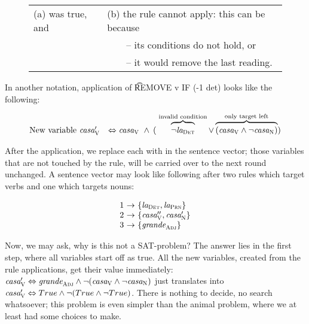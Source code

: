 \begin{figure}[h]
\begin{tabular}{l l}
(a) \oldVar{} was true, and 
                             & (b) the rule cannot apply: this can be because \\
                                     & ~~~~-- its conditions do not hold, or \\
                                     & ~~~~-- it would remove the last reading.
\end{tabular}
\end{figure}

\noindent In another notation, application of \t{REMOVE v IF (-1 det)} looks like the following:

$$\begin{array}{r l}
\text{New variable } \casa{}'_\v 
      & \Leftrightarrow \casaV\ 
        \wedge\: ( \; \ob{\neg\laDet}^{\invConds} 
        \vee  \ob{(\casaV \wedge \neg \casaN) }^{\onlyTrgLeft} ) \\
\end{array}$$


\noindent After the application, we replace each \oldVar with \newVar in the sentence vector; those variables that are not touched by the rule, will be carried over to the next round unchanged. A sentence vector may look like following after two rules which target verbs and one which targets nouns:


$$\begin{array}{l @{~\rightarrow~} l}
1 & \{\laDet, \laPrn \} \\
2 & \{\casa{}''_\v, \casa{}'_\n \} \\
3 & \{ \grandeAdj \} \\
\end{array}$$

Now, we may ask, why is this not a SAT-problem? %
The answer lies in the first step, where all variables start off as true. All the new variables, created from the rule applications, get their value immediately: $\text{\em casa}{}'_{\text{\sc V}} \Leftrightarrow \text{\em grande}_{\text{\sc Adj}} \wedge \neg (\text{\em casa}_{\text{\sc V}} \wedge \neg \text{\em casa}_{\text{\sc N}})$ just translates into $\text{\em casa}{}'_{\text{\sc V}} \Leftrightarrow True \wedge \neg (True \wedge \neg True)$. There is nothing to decide, no search whatsoever; this problem is even simpler than the animal problem, where we at least had some choices to make.

